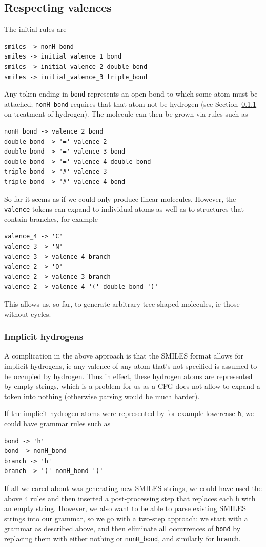 \documentclass{article}
\begin{document}
\subsection{Respecting valences}
The initial rules are
{\footnotesize 
\begin{verbatim}
smiles -> nonH_bond
smiles -> initial_valence_1 bond
smiles -> initial_valence_2 double_bond
smiles -> initial_valence_3 triple_bond
\end{verbatim}}
Any token ending in \verb|bond| represents an open bond to which some atom must be attached; \verb|nonH_bond| requires that that atom not be hydrogen (see Section~\ref{sec:hydrogen} on treatment of hydrogen). The molecule can then be grown via rules such as 
{\footnotesize 
\begin{verbatim}
nonH_bond -> valence_2 bond
double_bond -> '=' valence_2
double_bond -> '=' valence_3 bond
double_bond -> '=' valence_4 double_bond
triple_bond -> '#' valence_3 
triple_bond -> '#' valence_4 bond
\end{verbatim}}
So far it seems as if we could only produce linear molecules. However, the \verb|valence| tokens can expand to individual atoms as well as to structures that contain branches, for example
{\footnotesize 
\begin{verbatim}
valence_4 -> 'C'
valence_3 -> 'N'
valence_3 -> valence_4 branch
valence_2 -> 'O'
valence_2 -> valence_3 branch
valence_2 -> valence_4 '(' double_bond ')'
\end{verbatim}}
This allows us, so far, to generate arbitrary tree-shaped molecules, ie those without cycles.
\subsubsection{Implicit hydrogens}\label{sec:hydrogen}
A complication in the above approach is that the SMILES format allows for implicit hydrogens, ie any valence of any atom that's not specified is assumed to be occupied by hydrogen. Thus in effect, these hydrogen atoms are represented by empty strings, which is a problem for us as a CFG does not allow to expand a token into nothing (otherwise parsing would be much harder).

If the implicit hydrogen atoms were represented by for example lowercase \verb|h|, we could have grammar rules such as 
{\footnotesize 
\begin{verbatim}
bond -> 'h'
bond -> nonH_bond
branch -> 'h'
branch -> '(' nonH_bond ')'
\end{verbatim}}
If all we cared about was generating new SMILES strings, we could have used the above 4 rules and then inserted a post-processing step that replaces each \verb|h| with an empty string. However, we also want to be able to parse existing SMILES strings into our grammar, so we go with a two-step approach: we start with a grammar as described above, and then eliminate all occurrences of \verb|bond| by replacing them with either nothing or \verb|nonH_bond|, and similarly for \verb|branch|.
\end{document}

